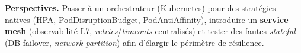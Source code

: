 \textbf{Perspectives.}
Passer à un orchestrateur (Kubernetes) pour des stratégies natives (HPA, PodDisruptionBudget, PodAntiAffinity), introduire un \textbf{service mesh} (observabilité L7, \textit{retries}/\textit{timeouts} centralisés) et tester des fautes \textit{stateful} (DB failover, \textit{network partition}) afin d'élargir le périmètre de résilience.
